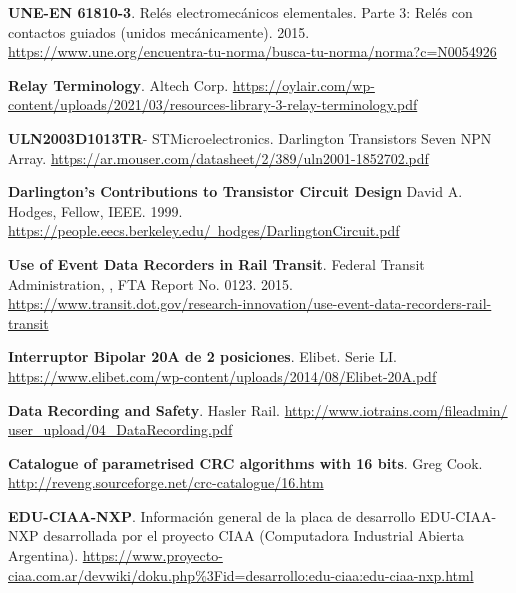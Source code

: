 \begin{thebibliography}{30}
\textbf{UNE-EN 61810-3}. Relés electromecánicos elementales. Parte 3: Relés con contactos guiados (unidos mecánicamente). 2015. 
\href{https://www.une.org/encuentra-tu-norma/busca-tu-norma/norma?c=N0054926}{https://www.une.org/encuentra-tu-norma/busca-tu-norma/norma?c=N0054926}


\textbf{Relay Terminology}. Altech Corp.
\href{https://oylair.com/wp-content/uploads/2021/03/resources-library-3-relay-terminology.pdf}{https://oylair.com/wp-content/uploads/2021/03/resources-library-3-relay-terminology.pdf}


\textbf{ULN2003D1013TR}- STMicroelectronics. Darlington Transistors Seven NPN Array.
\href{https://ar.mouser.com/datasheet/2/389/uln2001-1852702.pdf}{https://ar.mouser.com/datasheet/2/389/uln2001-1852702.pdf}

\textbf{Darlington’s Contributions to Transistor Circuit Design} David A. Hodges, Fellow, IEEE. 1999.
\href{https://people.eecs.berkeley.edu/~hodges/DarlingtonCircuit.pdf}{https://people.eecs.berkeley.edu/~hodges/DarlingtonCircuit.pdf}


\textbf{Use of Event Data Recorders in Rail Transit}. Federal Transit Administration, , FTA Report No. 0123. 2015.
\href{https://www.transit.dot.gov/research-innovation/use-event-data-recorders-rail-transit}{https://www.transit.dot.gov/research-innovation/use-event-data-recorders-rail-transit}

\textbf{Interruptor Bipolar 20A de 2 posiciones}. Elibet. Serie LI. 
\href{https://www.elibet.com/wp-content/uploads/2014/08/Elibet-20A.pdf}{https://www.elibet.com/wp-content/uploads/2014/08/Elibet-20A.pdf}

\textbf{Data Recording and Safety}. Hasler Rail. \href{http://www.iotrains.com/fileadmin/user_upload/04_DataRecording.pdf}{http://www.iotrains.com/fileadmin/ user\_upload/04\_DataRecording.pdf}

\textbf{Catalogue of parametrised CRC algorithms with 16 bits}. Greg Cook. 
\href{http://reveng.sourceforge.net/crc-catalogue/16.htm}{http://reveng.sourceforge.net/crc-catalogue/16.htm}


\textbf{EDU-CIAA-NXP}. Información general de la placa de desarrollo EDU-CIAA-NXP desarrollada por el proyecto CIAA (Computadora Industrial Abierta Argentina). \href{https://www.proyecto-ciaa.com.ar/devwiki/doku.php%3Fid=desarrollo:edu-ciaa:edu-ciaa-nxp.html}{https://www.proyecto-ciaa.com.ar/devwiki/doku.php\%3Fid=desarrollo:edu-ciaa:edu-ciaa-nxp.html}


\end{thebibliography}

